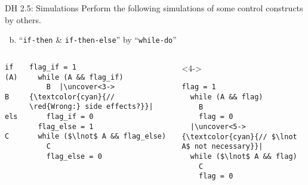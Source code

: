 \begin{frame}[fragile]{}
  \begin{exampleblock}{DH 2.5: Simulations}
    Perform the following simulations of some control constructs by others.
    \begin{enumerate}[(a)]
      \setcounter{enumi}{(1)}
      \item ``\texttt{if-then} \& \texttt{if-then-else}'' by ``\texttt{while-do}''
    \end{enumerate}
  \end{exampleblock}

  \begin{columns}
      \begin{lstlisting}[style = Cstyle, backgroundcolor = \color{teal!10!lightgray}]
  if (A)
    B
  else
    C
      \end{lstlisting}

      \pause
      \vspace{-0.20cm}
      \begin{lstlisting}[style = Cstyle]
  flag_if = 1
  while (A && flag_if)
    B  |\uncover<3->{\textcolor{cyan}{// \red{Wrong:} side effects?}}|
    flag_if = 0
  flag_else = 1
  while ($\lnot$ A && flag_else)
    C
    flag_else = 0
      \end{lstlisting}

      \begin{onlyenv}<4->
      \begin{lstlisting}[style = Cstyle]
  flag = 1
  while (A && flag)
    B
    flag = 0
  |\uncover<5->{\textcolor{cyan}{// $\lnot A$ not necessary}}|
  while ($\lnot$ A && flag)
    C
    flag = 0
      \end{lstlisting}
      \end{onlyenv}
  \end{columns}
\end{frame}
